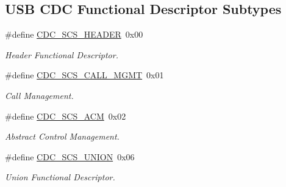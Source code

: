 \subsection*{U\+SB C\+DC Functional Descriptor Subtypes}
\begin{DoxyCompactItemize}
\item 
\mbox{\label{group__cdc__protocol__group_gafb7ba01e68938e255cfb6727c5a02f23}} 
\#define \hyperlink{group__cdc__protocol__group_gafb7ba01e68938e255cfb6727c5a02f23}{C\+D\+C\+\_\+\+S\+C\+S\+\_\+\+H\+E\+A\+D\+ER}~0x00
\begin{DoxyCompactList}\small\item\em Header Functional Descriptor. \end{DoxyCompactList}\item 
\mbox{\label{group__cdc__protocol__group_gaeda25d7337f810f2bd205b579510ebd4}} 
\#define \hyperlink{group__cdc__protocol__group_gaeda25d7337f810f2bd205b579510ebd4}{C\+D\+C\+\_\+\+S\+C\+S\+\_\+\+C\+A\+L\+L\+\_\+\+M\+G\+MT}~0x01
\begin{DoxyCompactList}\small\item\em Call Management. \end{DoxyCompactList}\item 
\mbox{\label{group__cdc__protocol__group_gac06eb7a8f7ac43f6be353cc8cc5f8ce8}} 
\#define \hyperlink{group__cdc__protocol__group_gac06eb7a8f7ac43f6be353cc8cc5f8ce8}{C\+D\+C\+\_\+\+S\+C\+S\+\_\+\+A\+CM}~0x02
\begin{DoxyCompactList}\small\item\em Abstract Control Management. \end{DoxyCompactList}\item 
\mbox{\label{group__cdc__protocol__group_ga27581d98e9052d843b2f4767f7d39110}} 
\#define \hyperlink{group__cdc__protocol__group_ga27581d98e9052d843b2f4767f7d39110}{C\+D\+C\+\_\+\+S\+C\+S\+\_\+\+U\+N\+I\+ON}~0x06
\begin{DoxyCompactList}\small\item\em Union Functional Descriptor. \end{DoxyCompactList}\end{DoxyCompactItemize}
